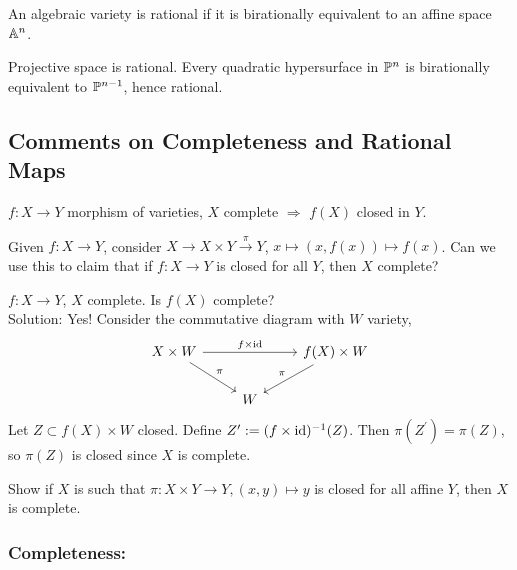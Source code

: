 \documentclass[a4paper,11pt]{article}
\begin{document}
			\begin{defi}
				An algebraic variety is rational if it is birationally equivalent to an affine space $\AA^n$.
			\end{defi}

			\begin{eg}
				Projective space is rational. Every quadratic hypersurface in $\P^n$ is birationally equivalent to $\P^{n-1}$, hence rational.
			\end{eg}

		{\color{gray}\subsection*{Comments on Completeness and Rational Maps}

			\begin{prop}
				$f:X\rightarrow Y$ morphism of varieties, $X$ complete $\Longrightarrow$ $f(X)$ closed in $Y$.
			\end{prop}

			\begin{exc}
				Given $f:X\rightarrow Y$, consider $X\rightarrow X\times Y\overset{\pi}{\rightarrow} Y$, $x\mapsto(x,f(x))\mapsto f(x)$. Can we use this to claim that if $f:X\rightarrow Y$ is closed for all $Y$, then $X$ complete? 
			\end{exc}

			\begin{exc}
				$f:X\rightarrow Y$, $X$ complete. Is $f(X)$ complete?\\
				Solution: Yes! Consider the commutative diagram with $W$ variety,
				\begin{equation*}
					\begin{tikzcd}
						X\times W\ar[dr,"\pi"]\ar[rr,"f\times \id"] & & f(X)\times W\ar[dl,"\pi"']\\
						& W &
					\end{tikzcd}
				\end{equation*} 
				Let $Z\subset f(X)\times W$ closed. Define $Z^\prime:=(f\times\id)^{-1}(Z)$. Then $\pi(Z^\prime)=\pi(Z)$, so $\pi(Z)$ is closed since $X$ is complete.
			\end{exc}

			\begin{exc}
				Show if $X$ is such that $\pi:X\times Y\rightarrow Y, (x,y)\mapsto y$ is closed for all affine $Y$, then $X$ is complete.
			\end{exc}

			\subsubsection*{Completeness:}
			
}
\end{document}
